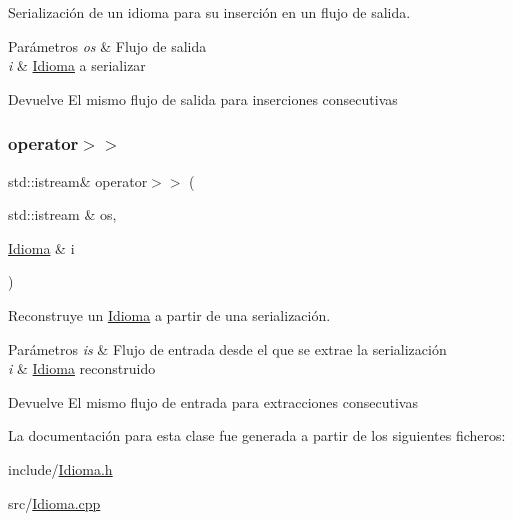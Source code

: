 Serialización de un idioma para su inserción en un flujo de salida. 


\begin{DoxyParams}{Parámetros}
{\em os} & Flujo de salida \\
\hline
{\em i} & \hyperlink{classIdioma}{Idioma} a serializar \\
\hline
\end{DoxyParams}
\begin{DoxyReturn}{Devuelve}
El mismo flujo de salida para inserciones consecutivas 
\end{DoxyReturn}
\mbox{\label{classIdioma_ad6842fe05d68733701bf98f04b439e8a}} 
\subsubsection{\texorpdfstring{operator$>$$>$}{operator>>}}
{\footnotesize\ttfamily std\+::istream\& operator$>$$>$ (\begin{DoxyParamCaption}\item[{std\+::istream \&}]{os,  }\item[{\hyperlink{classIdioma}{Idioma} \&}]{i }\end{DoxyParamCaption})\hspace{0.3cm}{\ttfamily [friend]}}



Reconstruye un \hyperlink{classIdioma}{Idioma} a partir de una serialización. 


\begin{DoxyParams}{Parámetros}
{\em is} & Flujo de entrada desde el que se extrae la serialización \\
\hline
{\em i} & \hyperlink{classIdioma}{Idioma} reconstruido \\
\hline
\end{DoxyParams}
\begin{DoxyReturn}{Devuelve}
El mismo flujo de entrada para extracciones consecutivas 
\end{DoxyReturn}


La documentación para esta clase fue generada a partir de los siguientes ficheros\+:\begin{DoxyCompactItemize}
\item 
include/\hyperlink{Idioma_8h}{Idioma.\+h}\item 
src/\hyperlink{Idioma_8cpp}{Idioma.\+cpp}\end{DoxyCompactItemize}
